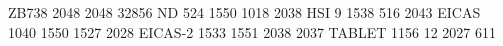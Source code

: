 ZB738 2048 2048 32856
ND        524 1550 1018 2038
HSI         9 1538  516 2043
EICAS    1040 1550 1527 2028
EICAS-2  1533 1551 2038 2037
TABLET   1156   12 2027  611
